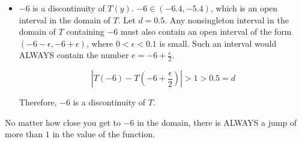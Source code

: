 \documentclass{ximera}
\begin{document}
\begin{example}
\begin{itemize}
\item $-6$ is a discontinuity of $T(y)$.  $-6 \in (-6.4, -5.4)$, which is an open interval in the domain of $T$. Let $d=0.5$. Any nonsingleton interval in the domain of $T$ containing $-6$ must also contain an open interval of the form $(-6-\epsilon, -6+\epsilon)$, where $0 < \epsilon < 0.1$ is small.  Such an interval would ALWAYS contain the number $e = -6+\frac{\epsilon}{2}$.

\[ \left| T(-6) - T\left(-6+\frac{\epsilon}{2}\right) \right| > 1 > 0.5 = d \]

Therefore, $-6$ is a discontinuity of $T$.

\end{itemize}



\end{example}

No matter how close you get to $-6$ in the domain, there is ALWAYS a jump of more than $1$ in the value of the function.  \\
\end{document}

